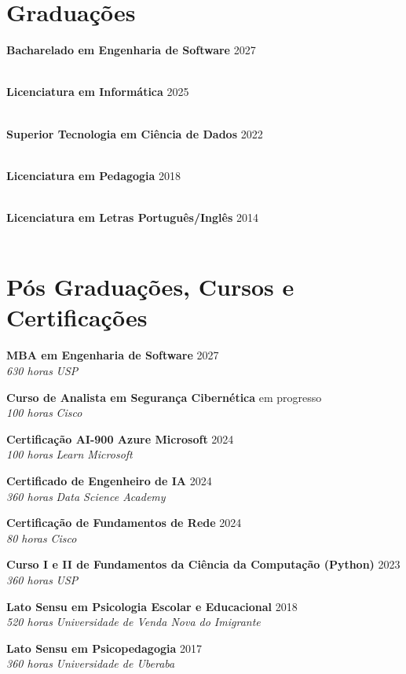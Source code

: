 \documentclass[a4paper,10pt]{article}
\newcommand{\entry}[4]{
  \noindent\textbf{#1} \hfill #2 \\
  \noindent\textit{#3} \hfill \textit{#4} \\
  \vspace{2pt}
}
\begin{document}
\vspace{0.6em}

\vspace{0.5em}

\section*{Graduações}
\vspace{0.6em}

\entry{Bacharelado em Engenharia de Software}{2027}{}
\space
\vspace{-1.6em}

\entry{Licenciatura em Informática}{2025}{}
\space
\vspace{-1.6em}

\entry{Superior Tecnologia em Ciência de Dados}{2022}{}
\space
\vspace{-1.6em}

\entry{Licenciatura em Pedagogia}{2018}{}
\space
\vspace{-1.6em}

\entry{Licenciatura em Letras Português/Inglês}{2014}{}
\space
\vspace{-1.6em}





\section*{Pós Graduações, Cursos e Certificações}
\vspace{0.6em}

\entry{MBA em Engenharia de Software}{2027}{630 horas}{USP}

\entry{Curso de Analista em Segurança Cibernética}{em progresso}{100 horas}{Cisco}

\entry{Certificação AI-900 Azure Microsoft}{2024}{100 horas}{Learn Microsoft}

\entry{Certificado de Engenheiro  de IA}{2024}{360 horas}{Data Science Academy}

\entry{Certificação de Fundamentos de Rede}{2024}{80 horas}{Cisco}

\entry{Curso I e II de Fundamentos da Ciência da Computação (Python)}{2023}{360 horas}{USP}

\entry{Lato Sensu em Psicologia Escolar e Educacional}{2018}{520 horas}{Universidade de Venda Nova do Imigrante}

\entry{Lato Sensu em Psicopedagogia}{2017}{360 horas}{Universidade de Uberaba}
\end{document}
